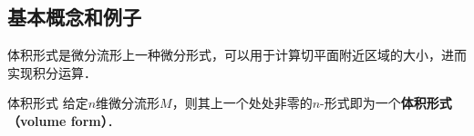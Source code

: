 






\subsection{基本概念和例子}


体积形式是微分流形上一种微分形式，可以用于计算切平面附近区域的大小，进而实现积分运算．

\begin{definition}{体积形式}
给定$n$维微分流形$M$，则其上一个处处非零的$n$-形式即为一个\textbf{体积形式（volume form）}．
\end{definition}

